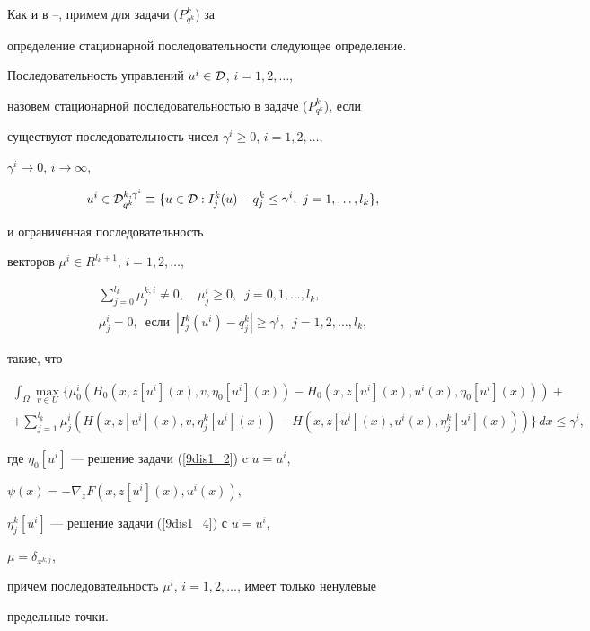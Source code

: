 Как и в \cite{sumin95}--\cite{sumin97b}, примем для задачи ($P^k_{q^k}$) за


определение стационарной последовательности следующее определение.





\begin{defns}\label{9d0}


Последовательность управлений $u^i\in{\cal D}$, $i=1,2,\dotsc$,


назовем стационарной последовательностью в задаче ($P^k_{q^k}$), если


существуют последовательность чисел $\gamma^i\geq 0$, $i=1,2,\dotsc$,


$\gamma^i\to 0$, $i\to\infty$,


$$


u^i\in{\cal D}_{q^k}^{k,\gamma^i}\equiv\{u\in{\cal D}:


I_j^k(u)-q_j^k\leq\gamma^i,\ j=1,\dotsc,l_k\},


$$


и ограниченная последовательность


векторов $\mu^i\in R^{l_k+1}$, $i=1,2,\dotsc$,


\begin{gather*}


\sum_{j=0}^{l_k}\mu_j^{k,i}\neq 0, \quad


\mu_j^i\geq 0, \ \; j=0,1,\dotsc,l_k, \\


%


\mu_j^i=0,\ \; \text{если}


\ \; |I^k_j(u^i)-q^k_j|\geq\gamma^i, \ \; j=1,2,\dotsc,l_k,


\end{gather*}


такие, что


\begin{multline*}


\int_\Omega\max_{v\in U}


\bigg\{\mu^i_0(H_0(x,z[u^i](x),v,\eta_0[u^i](x))-


H_0(x,z[u^i](x),u^i(x),\eta_0[u^i](x)))+ \\


%


+\sum_{j=1}^{l_k}\mu_j^i(H(x,z[u^i](x),v,\eta_j^k[u^i](x))-


H(x,z[u^i](x),u^i(x),\eta_j^k[u^i](x)))\bigg\}\,dx\leq\gamma^i,


\end{multline*}


где $\eta_0[u^i]$ --- решение задачи (\ref{9dis1_2}) c $u=u^i$,


$\psi(x)=-\nabla_zF(x,z[u^i](x),u^i(x))$,


$\eta_j^k[u^i]$ --- решение задачи (\ref{9dis1_4}) с $u=u^i$,


$\mu=\delta_{x^{k,j}}$,


причем последовательность $\mu^i$, $i=1,2,\dotsc$, имеет только ненулевые


предельные точки.


\end{defns}





